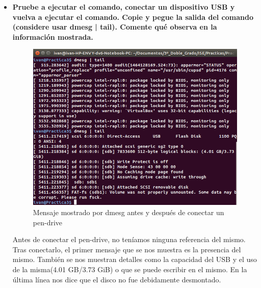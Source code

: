 \begin{itemize}
	\item \textbf{Pruebe a ejecutar el comando, conectar un dispositivo USB y vuelva a
		ejecutar el comando. Copie y pegue la salida del comando (considere usar dmesg |
		tail). Comente qué observa en la información mostrada.}\\
	
	\begin{figure}[H]
		\centering
		\includegraphics[width=0.7\linewidth]{dmesgPenDrive}
		\caption[dmesg]{Mensaje mostrado por dmesg antes y después de conectar un pen-drive}
		\label{fig:dmesgPenDrive}
	\end{figure}
	
	Antes de conectar el pen-drive, no teníamos ninguna referencia del mismo. Tras conectarlo, el primer mensaje que se nos muestra es la presencia del mismo. También se nos muestran detalles como la capacidad del USB y el uso de la misma(4.01 GB/3.73 GiB) o que se puede escribir en el mismo. En la última línea nos dice que el disco no fue debidamente desmontado.

	
\end{itemize}
\newpage
